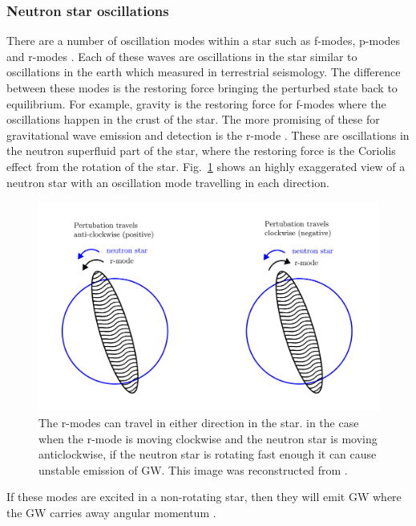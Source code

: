  \subsubsection{Neutron star oscillations}
There are a number of oscillation modes within a star such as f-modes, p-modes and r-modes \citep{becker2009NeutronStars}. 
Each of these waves are oscillations in the star similar to oscillations in the earth which measured in terrestrial seismology.
The difference between these modes is the restoring force bringing the perturbed state back to equilibrium.
For example, gravity is the restoring force for f-modes where the oscillations happen in the crust of the star.
The more promising of these for gravitational wave emission and detection is the r-mode \citep{lasky2015GravitationalWaves}. 
These are oscillations in the neutron superfluid part of the star, where the restoring force is the Coriolis effect from the rotation of the star.
Fig.~\ref{intro:source:cw:rmode} shows an highly exaggerated view of a neutron star with an oscillation mode travelling in each direction.
\begin{figure}[h]
	\centering
	\includegraphics[width=\textwidth]{C1_intro/rmode.pdf}
	\caption[Generating \glspl{GW} from r-modes in neutron stars.]{The r-modes can travel in either direction in the star. in the case when the r-mode is moving clockwise and the neutron star is moving anticlockwise, if the neutron star is rotating fast enough it can cause unstable emission of \gls{GW}. This image was reconstructed from \citep{jonesCFSInstability}.}
	\label{intro:source:cw:rmode}
\end{figure}
If these modes are excited in a non-rotating star, then they will emit \gls{GW} where the \gls{GW}  carries away angular momentum \citep{jonesCFSInstability}. 
